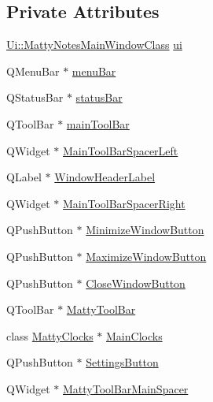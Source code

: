 \subsection*{Private Attributes}
\begin{DoxyCompactItemize}
\item 
\hyperlink{classUi_1_1MattyNotesMainWindowClass}{Ui\+::\+Matty\+Notes\+Main\+Window\+Class} \hyperlink{classMattyNotesMainWindow_a77eaa70bd33b9a31f6d3fe0aa5669190}{ui}
\item 
Q\+Menu\+Bar $\ast$ \hyperlink{classMattyNotesMainWindow_aad3423e267a86fc4e17cf1cc39a84173}{menu\+Bar}
\item 
Q\+Status\+Bar $\ast$ \hyperlink{classMattyNotesMainWindow_acccc534f50bac336cd6fabdba5406c12}{status\+Bar}
\item 
Q\+Tool\+Bar $\ast$ \hyperlink{classMattyNotesMainWindow_a573c7ad7a77e152e381f377481b15acb}{main\+Tool\+Bar}
\item 
Q\+Widget $\ast$ \hyperlink{classMattyNotesMainWindow_a0c0315e670c5b91955fa08ff7e16a631}{Main\+Tool\+Bar\+Spacer\+Left}
\item 
Q\+Label $\ast$ \hyperlink{classMattyNotesMainWindow_a615bd7bd2d770a4d0b97f09c71e32333}{Window\+Header\+Label}
\item 
Q\+Widget $\ast$ \hyperlink{classMattyNotesMainWindow_a022f28a03e7d9653aca44e9a11e2997b}{Main\+Tool\+Bar\+Spacer\+Right}
\item 
Q\+Push\+Button $\ast$ \hyperlink{classMattyNotesMainWindow_aa56b544884c8e5bceccd0442ad5f32f1}{Minimize\+Window\+Button}
\item 
Q\+Push\+Button $\ast$ \hyperlink{classMattyNotesMainWindow_a385e70529a6b11059d15d79cdf7d7ef3}{Maximize\+Window\+Button}
\item 
Q\+Push\+Button $\ast$ \hyperlink{classMattyNotesMainWindow_ac2eeae021e41b4529f0a0f370c6ea9ac}{Close\+Window\+Button}
\item 
Q\+Tool\+Bar $\ast$ \hyperlink{classMattyNotesMainWindow_a36941bdb55f9a9dabb1d8070f332f73d}{Matty\+Tool\+Bar}
\item 
class \hyperlink{classMattyClocks}{Matty\+Clocks} $\ast$ \hyperlink{classMattyNotesMainWindow_afe11d413e344c6d00bdceef2d500e47d}{Main\+Clocks}
\item 
Q\+Push\+Button $\ast$ \hyperlink{classMattyNotesMainWindow_ad9cb13412434d6fc084b5ead14b48356}{Settings\+Button}
\item 
Q\+Widget $\ast$ \hyperlink{classMattyNotesMainWindow_acd86504db4060e59acb9e3e59b68c84c}{Matty\+Tool\+Bar\+Main\+Spacer}

\end{DoxyCompactItemize}

